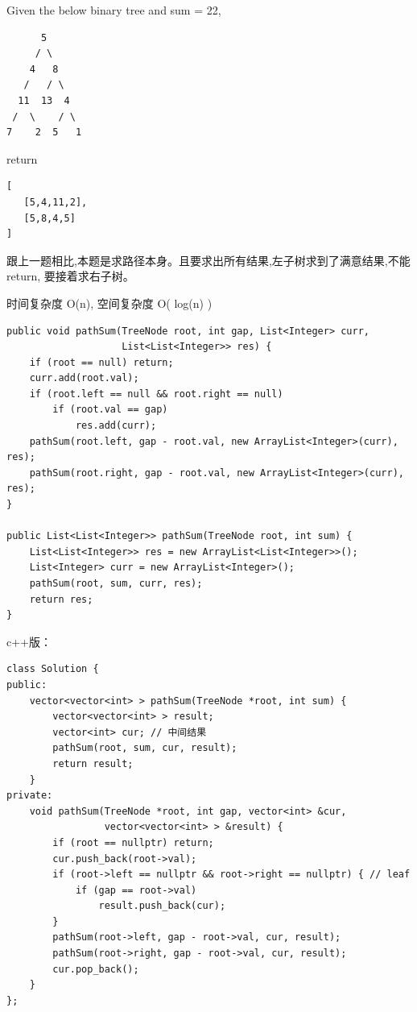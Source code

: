 \documentclass[12pt]{book}
\begin{document}
Given the below binary tree and sum = 22,
\lstset{language=java,label= ,caption= ,numbers=none}
\begin{lstlisting}
      5
     / \
    4   8
   /   / \
  11  13  4
 /  \    / \
7    2  5   1
\end{lstlisting}

return
\lstset{language=java,label= ,caption= ,numbers=none}
\begin{lstlisting}
[
   [5,4,11,2],
   [5,8,4,5]
]
\end{lstlisting}

跟上一题相比,本题是求路径本身。且要求出所有结果,左子树求到了满意结果,不能 return, 要接着求右子树。

时间复杂度 O(n), 空间复杂度 O( log(n) )

\lstset{language=java,label= ,caption= ,numbers=none}
\begin{lstlisting}
public void pathSum(TreeNode root, int gap, List<Integer> curr,
                    List<List<Integer>> res) {
    if (root == null) return;
    curr.add(root.val);
    if (root.left == null && root.right == null) 
        if (root.val == gap) 
            res.add(curr);
    pathSum(root.left, gap - root.val, new ArrayList<Integer>(curr), res);
    pathSum(root.right, gap - root.val, new ArrayList<Integer>(curr), res);
}

public List<List<Integer>> pathSum(TreeNode root, int sum) {
    List<List<Integer>> res = new ArrayList<List<Integer>>();
    List<Integer> curr = new ArrayList<Integer>();
    pathSum(root, sum, curr, res);
    return res;
}
\end{lstlisting}

c++版：
\lstset{language=java,label= ,caption= ,numbers=none}
\begin{lstlisting}
class Solution {
public:
    vector<vector<int> > pathSum(TreeNode *root, int sum) {
        vector<vector<int> > result;
        vector<int> cur; // 中间结果
        pathSum(root, sum, cur, result);
        return result;
    }
private:
    void pathSum(TreeNode *root, int gap, vector<int> &cur,
                 vector<vector<int> > &result) {
        if (root == nullptr) return;
        cur.push_back(root->val);
        if (root->left == nullptr && root->right == nullptr) { // leaf
            if (gap == root->val)
                result.push_back(cur);
        }
        pathSum(root->left, gap - root->val, cur, result);
        pathSum(root->right, gap - root->val, cur, result);
        cur.pop_back();
    }
};
\end{lstlisting}
\end{document}

